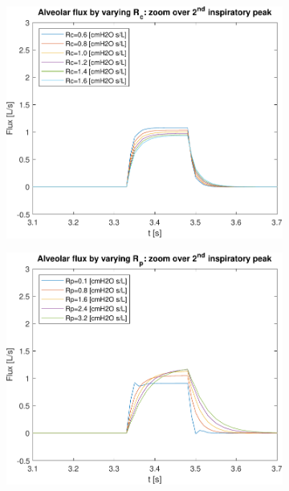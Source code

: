 \begin{figure}[t!]
	\begin{subfigure}{0.33\linewidth}
		\centering
		\includegraphics[width=0.95\linewidth]{../model/data_log/Rc_flux_alveolar_zoom.pdf}
		\caption{}
	\end{subfigure}\hfill
	\begin{subfigure}{0.33\linewidth}
		\centering
		\includegraphics[width=0.95\linewidth]{../model/data_log/Rp_flux_alveolar_zoom.pdf}
		\caption{}
	\end{subfigure}\hfill
	\begin{subfigure}{0.33\linewidth}

\end{subfigure}
\end{figure}
